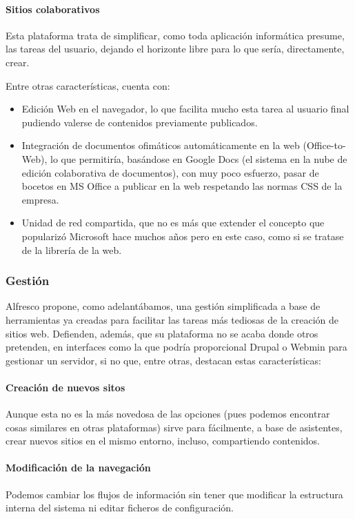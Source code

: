 \paragraph{Sitios colaborativos} 
\par Esta plataforma trata de simplificar, como toda aplicación informática presume, las tareas del usuario, dejando el horizonte libre para lo que sería, directamente, crear.
\par Entre otras características, cuenta con:
\begin{itemize}
 \item Edición Web en el navegador, lo que facilita mucho esta tarea al usuario final pudiendo valerse de contenidos previamente publicados.
 \item Integración de documentos ofimáticos automáticamente en la web (Office-to-Web), lo que permitiría, basándose en Google Docs (el sistema en la nube de edición colaborativa de documentos), con muy poco esfuerzo, pasar de bocetos en MS Office a publicar en la web respetando las normas CSS de la empresa.
 \item Unidad de red compartida, que no es más que extender el concepto que popularizó Microsoft hace muchos años pero en este caso, como si se tratase de la librería de la web.
\end{itemize}


\subsubsection{Gestión}
\par Alfresco propone, como adelantábamos, una gestión simplificada a base de herramientas ya creadas para facilitar las tareas más tediosas de la creación de sitios web. Defienden, además, que su plataforma no se acaba donde otros pretenden, en interfaces como la que podría proporcional Drupal o Webmin para gestionar un servidor, si no que, entre otras, destacan estas características:

\paragraph{Creación de nuevos sitos} Aunque esta no es la más novedosa de las opciones (pues podemos encontrar cosas similares en otras plataformas) sirve para fácilmente, a base de asistentes, crear nuevos sitios en el mismo entorno, incluso, compartiendo contenidos.

\paragraph{Modificación de la navegación} Podemos cambiar los flujos de información sin tener que modificar la estructura interna del sistema ni editar ficheros de configuración.

